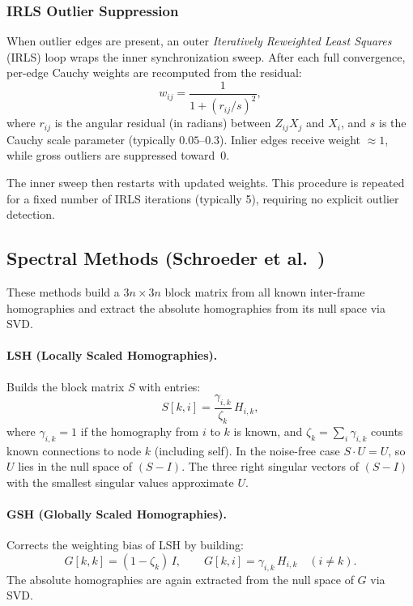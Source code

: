 \documentclass[11pt, a4paper]{article}
\begin{document}
\subsubsection{IRLS Outlier Suppression}

When outlier edges are present, an outer \emph{Iteratively Reweighted Least
Squares} (IRLS) loop wraps the inner synchronization sweep.  After each full
convergence, per-edge Cauchy weights are recomputed from the residual:
\begin{equation}
    w_{ij} = \frac{1}{1 + (r_{ij} / s)^2},
    \label{eq:cauchy}
\end{equation}
where $r_{ij}$ is the angular residual (in radians) between $Z_{ij} X_j$ and
$X_i$, and $s$ is the Cauchy scale parameter (typically $0.05$--$0.3$).  Inlier
edges receive weight $\approx 1$, while gross outliers are suppressed toward~$0$.

The inner sweep then restarts with updated weights.  This procedure is repeated
for a fixed number of IRLS iterations (typically 5), requiring no explicit
outlier detection.

\subsection{Spectral Methods (Schroeder et al.~\cite{schroeder2011})}

These methods build a $3n \times 3n$ block matrix from all known inter-frame
homographies and extract the absolute homographies from its null space via SVD.

\paragraph{LSH (Locally Scaled Homographies).}
Builds the block matrix $S$ with entries:
\begin{equation}
    S[k, i] = \frac{\gamma_{i,k}}{\zeta_k} \, H_{i,k},
\end{equation}
where $\gamma_{i,k} = 1$ if the homography from $i$ to $k$ is known,
and $\zeta_k = \sum_i \gamma_{i,k}$ counts known connections to node $k$
(including self).  In the noise-free case $S \cdot U = U$, so $U$ lies in the
null space of $(S - I)$.  The three right singular vectors of $(S-I)$ with the
smallest singular values approximate $U$.

\paragraph{GSH (Globally Scaled Homographies).}
Corrects the weighting bias of LSH by building:
\begin{equation}
    G[k,k] = (1 - \zeta_k)\,I, \qquad G[k,i] = \gamma_{i,k} \, H_{i,k}
    \quad (i \neq k).
\end{equation}
The absolute homographies are again extracted from the null space of $G$ via SVD.
\end{document}
